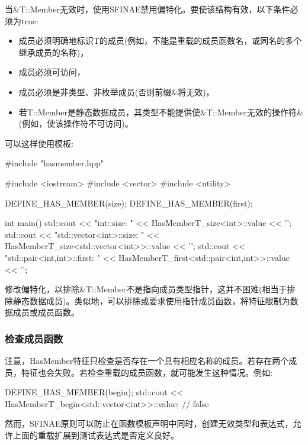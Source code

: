 当\&T::Member无效时，使用SFINAE禁用偏特化。要使该结构有效，以下条件必须为true:

\begin{itemize}
\item
成员必须明确地标识T的成员(例如，不能是重载的成员函数名，或同名的多个继承成员的名称)，

\item
成员必须可访问，

\item
成员必须是非类型、非枚举成员(否则前缀\&将无效)，

\item
若T::Member是静态数据成员，其类型不能提供使\&T::Member无效的操作符\&(例如，使该操作符不可访问)。
\end{itemize}

可以这样使用模板:

\begin{cpp}
#include "hasmember.hpp"

#include <iostream>
#include <vector>
#include <utility>

DEFINE_HAS_MEMBER(size);
DEFINE_HAS_MEMBER(first);

int main()
{
	std::cout << "int::size: "
				<< HasMemberT_size<int>::value << '\n';
	std::cout << "std::vector<int>::size: "
				<< HasMemberT_size<std::vector<int>>::value << '\n';
	std::cout << "std::pair<int,int>::first: "
				<< HasMemberT_first<std::pair<int,int>>::value << '\n';
}
\end{cpp}

修改偏特化，以排除\&T::Member不是指向成员类型指针，这并不困难(相当于排除静态数据成员)。类似地，可以排除或要求使用指针成员函数，将特征限制为数据成员或成员函数。

\subsubsection{检查成员函数}

注意，HasMember特征只检查是否存在一个具有相应名称的成员。若存在两个成员，特征也会失败。若检查重载的成员函数，就可能发生这种情况。例如:

\begin{cpp}
DEFINE_HAS_MEMBER(begin);
std::cout << HasMemberT_begin<std::vector<int>>::value; // false
\end{cpp}

然而，SFINAE原则可以防止在函数模板声明中同时，创建无效类型和表达式，允许上面的重载扩展到测试表达式是否定义良好。

